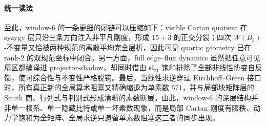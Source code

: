 \paragraph{统一读法}
至此，window-\(6\) 的一条更细的闭链可以压缩如下：visible Cartan quotient 在 syzygy 层只沿三条方向注入非平凡刚度，形成 \(15+3\) 的正交分裂；四次 \(W(B_3)\)-不变量又恰被两种规范的离散平均完全层析，因此可见 quartic geometry 已在 rank-\(2\) 的双规范坐标中闭合。另一方面，full edge--flux dynamics 虽然把任意可见扇区都编译进 projector-shadow，却同时借由 \(\mathfrak{sl}_{21}\) 饱和排除了全部非线性协变自反馈，使可综合性与不变性严格脱钩。最后，当线性求逆穿过 Kirchhoff--Green 接口时，所有真正新的全局算术阻塞又精确缩退为单素数 \(571\)，并与局部块矩阵层的 Smith 商、行列式与判别式形成清晰的素数断层。由此，window-\(6\) 的深层结构并非单一根系、单一隐藏比特或单一坏素数现象，而是局部 Cartan 刚度有限秩、动力学饱和为全矩阵、全局求逆只遗留单素数阻塞这三者的同步出现。

\endinput
